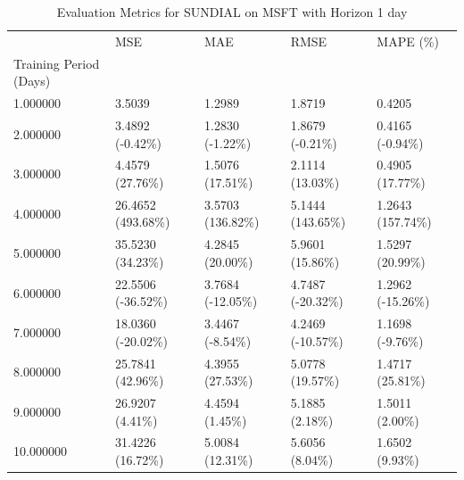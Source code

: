 \begin{table}
\caption{Evaluation Metrics for SUNDIAL on MSFT with Horizon 1 day}
\label{tab:sundial_MSFT_h1_metrics}
\begin{tabular}{lllll}
\toprule
 & MSE & MAE & RMSE & MAPE (\%) \\
Training Period (Days) &  &  &  &  \\
\midrule
1.000000 & 3.5039 & 1.2989 & 1.8719 & 0.4205 \\
2.000000 & 3.4892 (-0.42\%) & 1.2830 (-1.22\%) & 1.8679 (-0.21\%) & 0.4165 (-0.94\%) \\
3.000000 & 4.4579 (27.76\%) & 1.5076 (17.51\%) & 2.1114 (13.03\%) & 0.4905 (17.77\%) \\
4.000000 & 26.4652 (493.68\%) & 3.5703 (136.82\%) & 5.1444 (143.65\%) & 1.2643 (157.74\%) \\
5.000000 & 35.5230 (34.23\%) & 4.2845 (20.00\%) & 5.9601 (15.86\%) & 1.5297 (20.99\%) \\
6.000000 & 22.5506 (-36.52\%) & 3.7684 (-12.05\%) & 4.7487 (-20.32\%) & 1.2962 (-15.26\%) \\
7.000000 & 18.0360 (-20.02\%) & 3.4467 (-8.54\%) & 4.2469 (-10.57\%) & 1.1698 (-9.76\%) \\
8.000000 & 25.7841 (42.96\%) & 4.3955 (27.53\%) & 5.0778 (19.57\%) & 1.4717 (25.81\%) \\
9.000000 & 26.9207 (4.41\%) & 4.4594 (1.45\%) & 5.1885 (2.18\%) & 1.5011 (2.00\%) \\
10.000000 & 31.4226 (16.72\%) & 5.0084 (12.31\%) & 5.6056 (8.04\%) & 1.6502 (9.93\%) \\
\bottomrule
\end{tabular}
\end{table}
